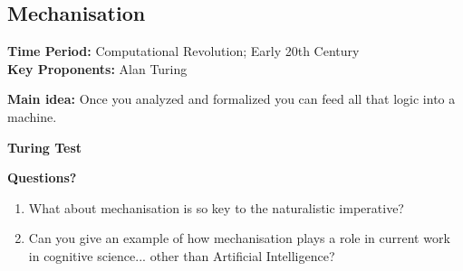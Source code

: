 \documentclass[twoside]{article}
\begin{document}
\subsection{Mechanisation}
\textbf{Time Period: } Computational Revolution; Early 20th Century \\
\textbf{Key Proponents: } Alan Turing

\textbf{Main idea: } Once you analyzed and formalized you can feed all that logic
into a machine.

\textbf{Turing Test}

\textbf{Questions?}
\begin{enumerate}
  \item What about mechanisation is so key to the naturalistic imperative?
  \item Can you give an example of how mechanisation plays a role in current work
        in cognitive science... other than Artificial Intelligence?
\end{enumerate}
\end{document}
